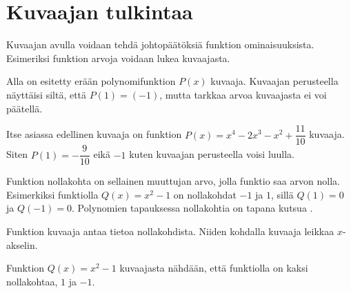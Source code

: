 \section*{Kuvaajan tulkintaa}


Kuvaajan avulla voidaan tehdä johtopäätöksiä funktion ominaisuuksista.
Esimeriksi funktion arvoja voidaan lukea kuvaajasta.

\begin{esimerkki}
Alla on esitetty erään polynomifunktion $P(x)$ kuvaaja. Kuvaajan perusteella näyttäisi siltä, että $P(1)=(-1)$,
mutta tarkkaa arvoa kuvaajasta ei voi päätellä.

\begin{kuvaajapohja}{1}{-2}{2}{-2}{2}
\end{kuvaajapohja}

Itse asiassa edellinen kuvaaja on funktion $P(x)=x^4-2x^3-x^2+\dfrac{11}{10}$ kuvaaja.
Siten $P(1)=-\dfrac{9}{10}$ eikä $-1$ kuten kuvaajan perusteella voisi luulla.
\end{esimerkki}

Funktion nollakohta on sellainen muuttujan arvo, jolla funktio saa arvon nolla. Esimerkiksi funktiolla $Q(x)=x^2-1$
on nollakohdat $-1$ ja $1$, sillä $Q(1)=0$ ja $Q(-1)=0$. Polynomien tapauksessa nollakohtia on tapana kutsua
.

Funktion kuvaaja antaa tietoa nollakohdista. Niiden kohdalla kuvaaja leikkaa $x$-akselin.

\begin{esimerkki}
Funktion $Q(x) = x^2-1$ kuvaajasta nähdään, että funktiolla on kaksi nollakohtaa, $1$ ja $-1$.

\begin{kuvaajapohja}{1}{-2}{2}{-2}{4}
\end{kuvaajapohja}
\end{esimerkki}


